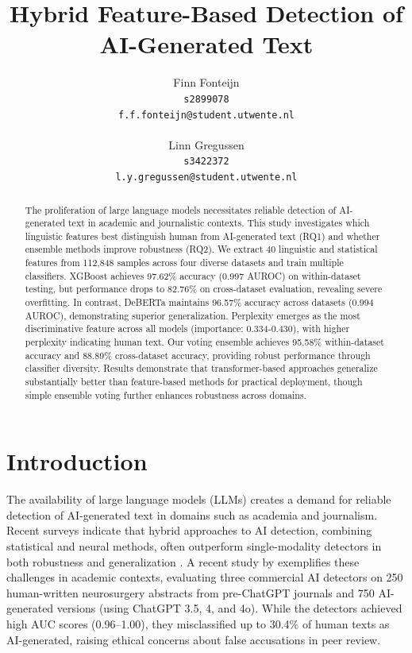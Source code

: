 \documentclass[11pt]{article}
\title{Hybrid Feature-Based Detection of AI-Generated Text}
\author{Finn Fonteijn \\
  \texttt{s2899078} \\
  \texttt{f.f.fonteijn@student.utwente.nl} \\
  \\\And
  Linn Gregussen \\
  \texttt{s3422372} \\
  \texttt{l.y.gregussen@student.utwente.nl} \\}
\begin{document}
\maketitle
\begin{abstract}
The proliferation of large language models necessitates reliable detection of AI-generated text in academic and journalistic contexts. This study investigates which linguistic features best distinguish human from AI-generated text (RQ1) and whether ensemble methods improve robustness (RQ2). We extract 40 linguistic and statistical features from 112,848 samples across four diverse datasets and train multiple classifiers. XGBoost achieves 97.62\% accuracy (0.997 AUROC) on within-dataset testing, but performance drops to 82.76\% on cross-dataset evaluation, revealing severe overfitting. In contrast, DeBERTa maintains 96.57\% accuracy across datasets (0.994 AUROC), demonstrating superior generalization. Perplexity emerges as the most discriminative feature across all models (importance: 0.334-0.430), with higher perplexity indicating human text. Our voting ensemble achieves 95.58\% within-dataset accuracy and 88.89\% cross-dataset accuracy, providing robust performance through classifier diversity. Results demonstrate that transformer-based approaches generalize substantially better than feature-based methods for practical deployment, though simple ensemble voting further enhances robustness across domains.
\end{abstract}

\section{Introduction}
\label{sec:introduction}

The availability of large language models (LLMs) creates a demand for reliable detection of AI-generated text in domains such as academia and journalism. Recent surveys indicate that hybrid approaches to AI detection, combining statistical and neural methods, often outperform single-modality detectors in both robustness and generalization \citep{wu-etal-2025-survey, su2024robustdetectionllmgeneratedtext}. A recent study by \citet{erol2025trust} exemplifies these challenges in academic contexts, evaluating three commercial AI detectors on 250 human-written neurosurgery abstracts from pre-ChatGPT journals and 750 AI-generated versions (using ChatGPT 3.5, 4, and 4o). While the detectors achieved high AUC scores (0.96--1.00), they misclassified up to 30.4\% of human texts as AI-generated, raising ethical concerns about false accusations in peer review.
\end{document}
